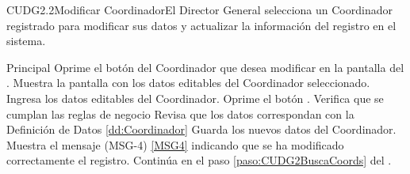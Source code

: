 	\begin{UseCase}{CUDG2.2}{Modificar Coordinador}{El Director General selecciona un Coordinador registrado para modificar sus datos y actualizar la información del registro en el sistema.}
	\end{UseCase}

	\begin{UCtrayectoria}{Principal}			
			\UCpaso[\UCactor] Oprime el botón  del Coordinador que desea modificar en la pantalla  del .	
			\UCpaso Muestra la pantalla  con los datos editables del Coordinador seleccionado.
                        \UCpaso [\UCactor] Ingresa los datos editables del Coordinador.\label{paso:CUDG2.2IngresaDatos}
			\UCpaso [\UCactor] Oprime el botón .
			\UCpaso Verifica que se cumplan las reglas de negocio  
			\UCpaso Revisa que los datos correspondan con la Definición de Datos \ref{dd:Coordinador} 
			\UCpaso Guarda los nuevos datos del Coordinador.
			\UCpaso Muestra el mensaje (MSG-4) \ref{MSG4} indicando que se ha modificado correctamente el registro.
			\UCpaso Continúa en el paso \ref{paso:CUDG2BuscaCoords} del .
	\end{UCtrayectoria}

